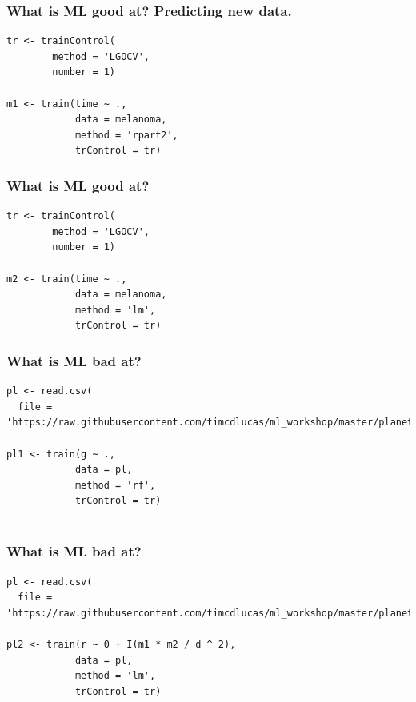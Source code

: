 \documentclass[handout, aspectratio = 169]{beamer}
\begin{document}
\begin{frame}[fragile]
\frametitle{What is ML good at? Predicting new data.}
\renewcommand{\FancyVerbFormatLine}[1]{%
   \ifnum\value{FancyVerbLine}=8\color{cyan}#1%
   \else #1\fi}
\begin{Verbatim}
tr <- trainControl(
        method = 'LGOCV',
        number = 1)

m1 <- train(time ~ ., 
            data = melanoma,
            method = 'rpart2',
            trControl = tr)

\end{Verbatim}

\end{frame} 






\begin{frame}[fragile]
\frametitle{What is ML good at?}
\renewcommand{\FancyVerbFormatLine}[1]{%
   \ifnum\value{FancyVerbLine}=7\color{cyan}#1%
   \else #1\fi}
\begin{Verbatim}
tr <- trainControl(
        method = 'LGOCV',
        number = 1)

m2 <- train(time ~ ., 
            data = melanoma,
            method = 'lm',
            trControl = tr)

\end{Verbatim}

\end{frame} 






\begin{frame}[fragile]
\frametitle{What is ML bad at?}
\renewcommand{\FancyVerbFormatLine}[1]{%
   \ifnum\value{FancyVerbLine}=1\color{cyan}#1%
   \else #1\fi}
\begin{Verbatim}
pl <- read.csv(
  file = 'https://raw.githubusercontent.com/timcdlucas/ml_workshop/master/planets.csv')

pl1 <- train(g ~ ., 
            data = pl,
            method = 'rf',
            trControl = tr)


\end{Verbatim}

\end{frame} 


\begin{frame}[fragile]
\frametitle{What is ML bad at?}
\renewcommand{\FancyVerbFormatLine}[1]{%
   \ifnum\value{FancyVerbLine}=1\color{cyan}#1%
   \else #1\fi}
\begin{Verbatim}
pl <- read.csv(
  file = 'https://raw.githubusercontent.com/timcdlucas/ml_workshop/master/planets.csv')

pl2 <- train(r ~ 0 + I(m1 * m2 / d ^ 2), 
            data = pl,
            method = 'lm',
            trControl = tr)

\end{Verbatim}

\end{frame} 
\end{document}
